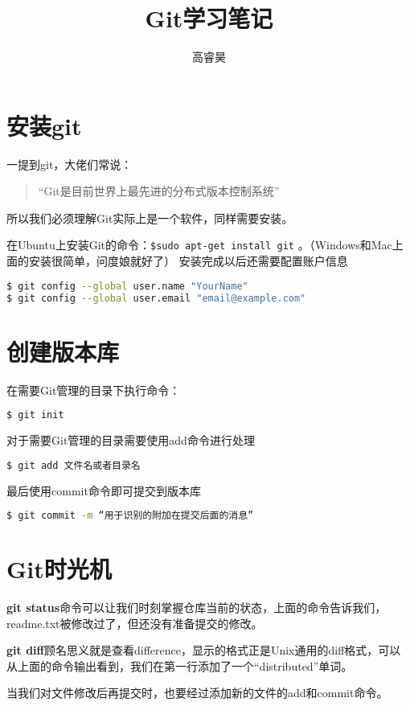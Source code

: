 \documentclass[UTF8]{ctexart}
\author{高睿昊}
\title{\zihao{0}\heiti Git学习笔记}
\newenvironment{myquote}
  {\begin{quote}\kaishu\zihao{-5}}
  {\end{quote}}
\begin{document}
\maketitle

\section{安装git}
一提到git，大佬们常说：
\begin{myquote}
\kaishu “Git是目前世界上最先进的分布式版本控制系统”
\end{myquote}
所以我们必须理解Git实际上是一个软件，同样需要安装。

在Ubuntu上安装Git的命令：\verb!$sudo apt-get install git! 。（Windows和Mac上面的安装很简单，问度娘就好了）
安装完成以后还需要配置账户信息
\begin{lstlisting}[language=bash]
$ git config --global user.name "YourName"
$ git config --global user.email "email@example.com"
\end{lstlisting}

\section{创建版本库}
在需要Git管理的目录下执行命令：
\begin{lstlisting}[language=bash]
$ git init
\end{lstlisting}
对于需要Git管理的目录需要使用add命令进行处理
\begin{lstlisting}[language=bash]
$ git add 文件名或者目录名
\end{lstlisting}
最后使用commit命令即可提交到版本库
\begin{lstlisting}[language=bash]
$ git commit -m “用于识别的附加在提交后面的消息”
\end{lstlisting}

\section{Git时光机}
\textbf{git status}命令可以让我们时刻掌握仓库当前的状态，上面的命令告诉我们，readme.txt被修改过了，但还没有准备提交的修改。

\textbf{git diff}顾名思义就是查看difference，显示的格式正是Unix通用的diff格式，可以从上面的命令输出看到，我们在第一行添加了一个“distributed”单词。

当我们对文件修改后再提交时，也要经过添加新的文件的add和commit命令。
\end{document}
